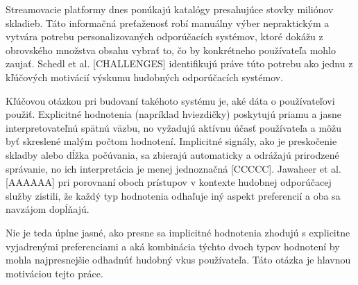 

Streamovacie platformy dnes ponúkajú katalógy presahujúce stovky miliónov skladieb. Táto informačná preťaženosť robí manuálny výber nepraktickým a vytvára potrebu personalizovaných odporúčacích systémov, ktoré dokážu z obrovského množstva obsahu vybrať to, čo by konkrétneho používateľa mohlo zaujať. Schedl et al. \cite{challenges}[CHALLENGES] identifikujú práve túto potrebu ako jednu z kľúčových motivácií výskumu hudobných odporúčacích systémov.

Kľúčovou otázkou pri budovaní takéhoto systému je, aké dáta o používateľovi použiť. Explicitné hodnotenia (napríklad hviezdičky) poskytujú priamu a jasne interpretovateľnú spätnú väzbu, no vyžadujú aktívnu účasť používateľa a môžu byť skreslené malým počtom hodnotení. Implicitné signály, ako je preskočenie skladby alebo dĺžka počúvania, sa zbierajú automaticky a odrážajú prirodzené správanie, no ich interpretácia je menej jednoznačná [CCCCC]. Jawaheer et al. [AAAAAA] pri porovnaní oboch prístupov v kontexte hudobnej odporúčacej služby zistili, že každý typ hodnotenia odhaľuje iný aspekt preferencií a oba sa navzájom dopĺňajú.

Nie je teda úplne jasné, ako presne sa implicitné hodnotenia zhodujú s explicitne vyjadrenými preferenciami a aká kombinácia týchto dvoch typov hodnotení by mohla najpresnejšie odhadnúť hudobný vkus používateľa. Táto otázka je hlavnou motiváciou tejto práce.

